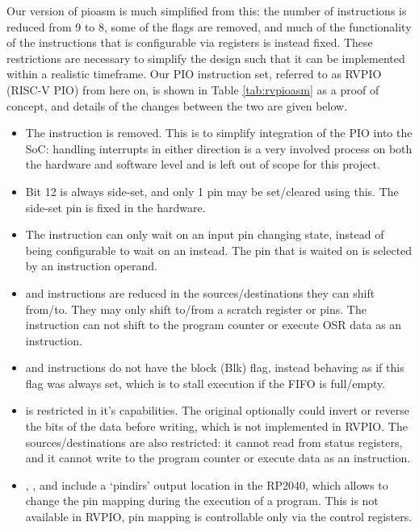 Our version of pioasm is much simplified from this: the number of instructions is reduced from 9 to 8, some of the flags are removed, and much of the functionality of the instructions that is configurable via registers is instead fixed. These restrictions are necessary to simplify the design such that it can be implemented within a realistic timeframe. Our PIO instruction set, referred to as RVPIO (RISC-V PIO) from here on, is shown in Table \ref{tab:rvpioasm} as a proof of concept, and details of the changes between the two are given below.

\begin{itemize}
    \item The  instruction is removed. This is to simplify integration of the PIO into the SoC: handling interrupts in either direction is a very involved process on both the hardware and software level and is left out of scope for this project.
    \item Bit 12 is always side-set, and only 1 pin may be set/cleared using this. The side-set pin is fixed in the hardware.
    \item The  instruction can only wait on an input pin changing state, instead of being configurable to wait on an  instead. The pin that is waited on is selected by an instruction operand.
    \item {} and  instructions are reduced in the sources/destinations they can shift from/to. They may only shift to/from a scratch register or pins. The  instruction can not shift to the program counter or execute OSR data as an instruction.
    \item {} and  instructions do not have the block (Blk) flag, instead behaving as if this flag was always set, which is to stall execution if the FIFO is full/empty.
    \item {} is restricted in it's capabilities. The original optionally could invert or reverse the bits of the data before writing, which is not implemented in RVPIO. The sources/destinations are also restricted: it cannot read from status registers, and it cannot write to the program counter or execute data as an instruction.
    \item {}, , and  include a `pindirs' output location in the RP2040, which allows to change the pin mapping during the execution of a program. This is not available in RVPIO, pin mapping is controllable only via the control registers.
\end{itemize}

